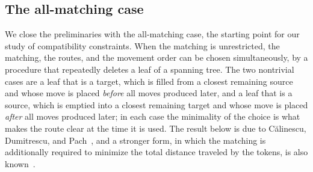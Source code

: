 \documentclass[a4paper,USenglish,thm-restate]{lipics-v2021}
\theoremstyle{problemstyle}
\begin{document}
\subsection{The all-matching case}
We close the preliminaries with the all-matching case, the starting point for
our study of compatibility constraints. When the matching is unrestricted, the
matching, the routes, and the movement order can be chosen simultaneously, by a
procedure that repeatedly deletes a leaf of a spanning tree. The two nontrivial
cases are a leaf that is a target, which is filled from a closest remaining
source and whose move is placed \emph{before} all moves produced later, and a
leaf that is a source, which is emptied into a closest remaining target and
whose move is placed \emph{after} all moves produced later; in each case the
minimality of the choice is what makes the route clear at the time it is
used. The result below is due to C\u{a}linescu, Dumitrescu, and
Pach~\cite{Calinescu2008Reconfigurations}, and a stronger form, in which the
matching is additionally required to minimize the total distance traveled
by the tokens, is also known~\cite{ElSabeh2023ARO}.

\allMatching*
\end{document}
